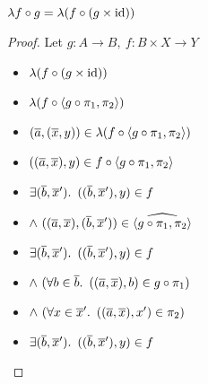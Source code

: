 \begin{prop}
  $\lambda f\circ g = \lambda(f\circ (g\times\operatorname{id}))$
  \begin{proof}
    Let $g : A\to B,~f :B\times X\to Y$
    \begin{itemize}
    \item[\phs]
      $\lambda(f\circ(g\times\operatorname{id}))$
    \item[\eqs]
      $\lambda(f\circ\langle g\circ\pi_1,\pi_2\rangle)$
      \marginnote{\Def-$\times$}

    \addtolength{\itemsep}{.5\baselineskip}
    \item[\phantom{\imps}]
      $(\overline{a},(\overline{x},y))\in \lambda(f\circ\langle g\circ\pi_1,\pi_2\rangle)$

    \addtolength{\itemsep}{-.5\baselineskip}
    \item[\iffs]
      $((\overline{a},\overline{x}),y)\in f\circ\langle g\circ\pi_1,\pi_2\rangle$
      \marginnote{\Def-$\lambda\cdot$}

    \item[\iffs]
      $\exists(\overline{b},\overline{x}^\prime)\ldotp~((\overline{b},\overline{x}^\prime),y)\in f$
      \marginnote{\Def-\ref{def:crel-comp}}

    \addtolength{\itemsep}{-.3\baselineskip}
    \item[\phantom{\imps}]
      \quad$\land~((\overline{a},\overline{x}),(\overline{b},\overline{x}^\prime))\in\widehat{\langle g\circ\pi_1,\pi_2\rangle}$
    \addtolength{\itemsep}{.3\baselineskip}

    \item[\iffs]
      $\exists(\overline{b},\overline{x}^\prime)\ldotp~((\overline{b},\overline{x}^\prime),y)\in f$

    \addtolength{\itemsep}{-.3\baselineskip}
    \item[\phantom{\imps}]
      \quad$\land~(\forall b\in\overline{b}\ldotp~((\overline{a},\overline{x}),b)\in g\circ\pi_1)$

    \item[\phantom{\imps}]
      \quad$\land~(\forall x\in\overline{x}^\prime\ldotp~((\overline{a},\overline{x}),x^\prime)\in \pi_2)$
    \addtolength{\itemsep}{.3\baselineskip}

    \item[\iffs]
      $\exists(\overline{b},\overline{x}^\prime)\ldotp~((\overline{b},\overline{x}^\prime),y)\in f$


\end{itemize}
\end{proof}
\end{prop}
